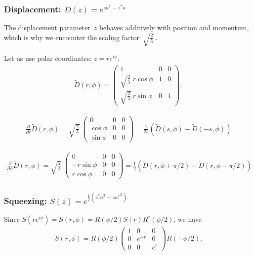 \documentclass[aps,pra,10pt,twocolumn,groupedaddress,nofootinbib]{revtex4-1}
\theoremstyle{plain}
\newcommand{\pd}[2]{\frac{\partial #1}{\partial #2}}  %
\newcommand{\Admap}[1]{\tilde{#1}} %
\begin{document}
\subsubsection{Displacement: $D(z) = e^{z a^\dagger -z^* a}$}

\newcommand{\sca}{\sqrt{\frac{2}{\lambda}} \:}

The displacement parameter~$z$ behaves additively with position and momentum,
which is why we encounter the scaling factor~$\sca$.

Let us use polar coordinates: $z = r e^{i\phi}$.
\begin{align*}
\Admap{D}(r, \phi)
=
\begin{pmatrix}
  1 & 0 & 0\\
  \sca r \cos \phi & 1 & 0\\
  \sca r \sin \phi & 0 & 1
\end{pmatrix},
\end{align*}

\begin{align*}
\pd{}{r} \Admap{D}(r, \phi)
=
\sca
\begin{pmatrix}
  0 & 0 & 0\\
  \cos \phi & 0 & 0\\
  \sin \phi & 0 & 0
\end{pmatrix}
= \frac{1}{2s} (\Admap{D}(s, \phi) -\Admap{D}(-s, \phi))
\end{align*}


\begin{align*}
\pd{}{\phi} \Admap{D}(r, \phi)
=
\sca
\begin{pmatrix}
  0 & 0 & 0\\
  -r \sin \phi & 0 & 0\\
  r \cos \phi & 0 & 0
\end{pmatrix}
= \frac{1}{2} (\Admap{D}(r, \phi+\pi/2) -\Admap{D}(r, \phi-\pi/2))
\end{align*}




\subsubsection{Squeezing: $S(z) = e^{\frac{1}{2}(z^* a^2 -z{a^\dagger}^2)}$}

Since
$S(r e^{i\phi}) = S(r, \phi) = R(\phi/2) S(r) R^\dagger(\phi/2)$,
we have
\begin{align*}
\Admap{S}(r, \phi) =
\Admap{R}(\phi/2)
\begin{pmatrix}
  1 & 0 & 0\\
  0 & e^{-r} & 0\\
  0 & 0 & e^r
\end{pmatrix}
\Admap{R}(-\phi/2).
\end{align*}
\end{document}
